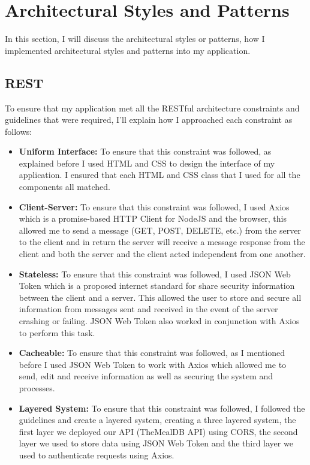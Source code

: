 \section{Architectural Styles and Patterns}

In this section, I will discuss the architectural styles or patterns, how I implemented architectural styles and patterns into my application. 

\subsection{REST}

To ensure that my application met all the RESTful architecture constraints and guidelines that were required, I'll explain how I approached each constraint as follows:

\begin{itemize}
    \item \textbf{Uniform Interface:} To ensure that this constraint was followed, as explained before I used HTML and CSS to design the interface of my application. I ensured that each HTML and CSS class that I used for all the components all matched.
    \item \textbf{Client-Server:} To ensure that this constraint was followed, I used Axios which is a promise-based HTTP Client for NodeJS and the browser, this allowed me to send a message (GET, POST, DELETE, etc.) from the server to the client and in return the server will receive a message response from the client and both the server and the client acted independent from one another.
    \item \textbf{Stateless:} To ensure that this constraint was followed, I used JSON Web Token which is a proposed internet standard for share security information between the client and a server. This allowed the user to store and secure all information from messages sent and received in the event of the server crashing or failing. JSON Web Token also worked in conjunction with Axios to perform this task. 
    \item \textbf{Cacheable:} To ensure that this constraint was followed, as I mentioned before I used JSON Web Token to work with Axios which allowed me to send, edit and receive information as well as securing the system and processes.
    \item \textbf{Layered System:} To ensure that this constraint was followed, I followed the guidelines and create a layered system, creating a three layered system, the first layer we deployed our API (TheMealDB API) using CORS, the second layer we used to store data using JSON Web Token and the third layer we used to authenticate requests using Axios.
\end{itemize}


